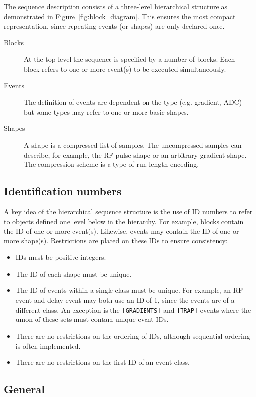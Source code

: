\documentclass{article}
\begin{document}
The sequence description consists of a three-level hierarchical structure as demonstrated in Figure~\ref{fig:block_diagram}. This ensures the most compact representation, since repeating events (or shapes) are only declared once.
\begin{description}
\item[Blocks] At the top level the sequence is specified by a number of blocks. Each block refers to one or more event(s) to be executed simultaneously.
\item[Events] The definition of events are dependent on the type (e.g. gradient, ADC) but some types may refer to one or more basic shapes.
\item[Shapes] A shape is a compressed list of samples. The uncompressed samples can describe, for example, the RF pulse shape or an arbitrary gradient shape. The compression scheme is a type of run-length encoding.
\end{description}

\subsection{Identification numbers}
A key idea of the hierarchical sequence structure is the use of ID numbers to refer to objects defined one level below in the hierarchy. For example, blocks contain the ID of one or more event(s). Likewise, events may contain the ID of one or more shape(s). Restrictions are placed on these IDs to ensure consistency:
\begin{itemize}
\item IDs must be positive integers.
\item The ID of each shape must be unique.
\item The ID of events within a single class must be unique. For example, an RF event and delay event may both use an ID of 1, since the events are of a different class. An exception is the \verb.[GRADIENTS]. and \verb.[TRAP]. events where the union of these sets must contain unique event IDs.
\item There are no restrictions on the ordering of IDs, although sequential ordering is often implemented.
\item There are no restrictions on the first ID of an event class.
\end{itemize}

\subsection{General}
\end{document}
